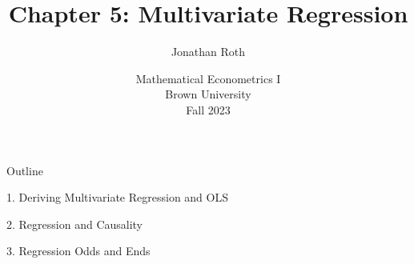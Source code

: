 \documentclass[11pt,english,handout]{beamer}
\begin{document}
	
	\begin{frame}[noframenumbering]{}
		\vspace{0.5cm}
		\title[]{Chapter 5: Multivariate Regression}
		\author{Jonathan Roth}
		\date{Mathematical Econometrics I \\ Brown University\\Fall 2023} 
		\titlepage {\small{}\ }\thispagestyle{empty} \vspace{-30pt}
		
	\end{frame}
	
	
	\begin{frame}{Outline}

	1. Deriving Multivariate Regression and OLS
	\vspace{0.8cm}
	
	2. Regression and Causality
	\vspace{0.8cm}
	
	3. Regression Odds and Ends
	
	\end{frame}
		
\end{document}
